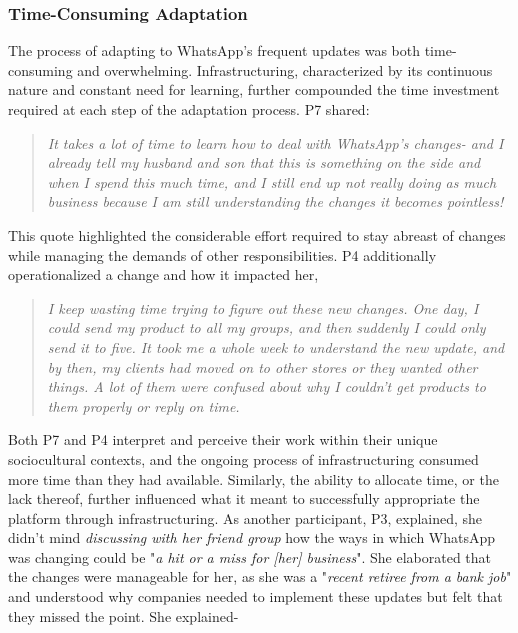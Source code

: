 \subsubsection{Time-Consuming Adaptation}

The process of adapting to WhatsApp’s frequent updates was both time-consuming and overwhelming. Infrastructuring, characterized by its continuous nature and constant need for learning, further compounded the time investment required at each step of the adaptation process. P7 shared:

\begin{quote}
\textit{It takes a lot of time to learn how to deal with WhatsApp’s changes- and I already tell my husband and son that this is something on the side and when I spend this much time, and I still end up not really doing as much business because I am still understanding the changes it becomes pointless!}
\end{quote}

This quote highlighted the considerable effort required to stay abreast of changes while managing the demands of  other responsibilities. P4 additionally operationalized a change and how it impacted her, 

\begin{quote}
    \textit{I keep wasting time trying to figure out these new changes. One day, I could send my product to all my groups, and then suddenly I could only send it to five. It took me a whole week to understand the new update, and by then, my clients had moved on to other stores or they wanted other things. A lot of them were confused about why I couldn’t get products to them properly or reply on time.}
\end{quote}

Both P7 and P4 interpret and perceive their work within their unique sociocultural contexts, and the ongoing process of infrastructuring consumed more time than they had available. Similarly, the ability to allocate time, or the lack thereof, further influenced what it meant to successfully appropriate the platform through infrastructuring. As another participant, P3, explained, she didn't mind \textit{discussing with her friend group} how the ways in which WhatsApp was changing could be "\textit{a hit or a miss for [her] business}". She elaborated that the changes were manageable for her, as she was a "\textit{recent retiree from a bank job}" and understood why companies needed to implement these updates but felt that they missed the point. She explained-


